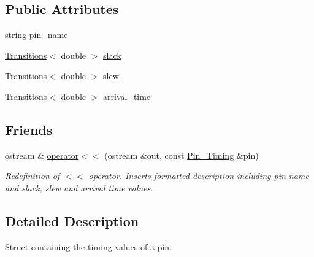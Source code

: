 \subsection*{Public Attributes}
\begin{DoxyCompactItemize}
\item 
string \hyperlink{structPrime__Time__Output__Parser_1_1Pin__Timing_adf3b868ae9f5a9cf5fa4605431bef741}{pin\-\_\-name}
\item 
\hyperlink{classTransitions}{Transitions}$<$ double $>$ \hyperlink{structPrime__Time__Output__Parser_1_1Pin__Timing_a9619e81ea7b859c6c600daaaf3754051}{slack}
\item 
\hyperlink{classTransitions}{Transitions}$<$ double $>$ \hyperlink{structPrime__Time__Output__Parser_1_1Pin__Timing_af7d7bae7417f6586e445c5bb415a1d43}{slew}
\item 
\hyperlink{classTransitions}{Transitions}$<$ double $>$ \hyperlink{structPrime__Time__Output__Parser_1_1Pin__Timing_a2737c385dec9bd775aa20f860293fbd0}{arrival\-\_\-time}
\end{DoxyCompactItemize}
\subsection*{Friends}
\begin{DoxyCompactItemize}
\item 
ostream \& \hyperlink{structPrime__Time__Output__Parser_1_1Pin__Timing_a8ea07e765281219a4b6c4adf6c2274ea}{operator$<$$<$} (ostream \&out, const \hyperlink{structPrime__Time__Output__Parser_1_1Pin__Timing}{Pin\-\_\-\-Timing} \&pin)
\begin{DoxyCompactList}\small\item\em Redefinition of $<$$<$ operator. Inserts formatted description including pin name and slack, slew and arrival time values. \end{DoxyCompactList}\end{DoxyCompactItemize}


\subsection{Detailed Description}
Struct containing the timing values of a pin. 


